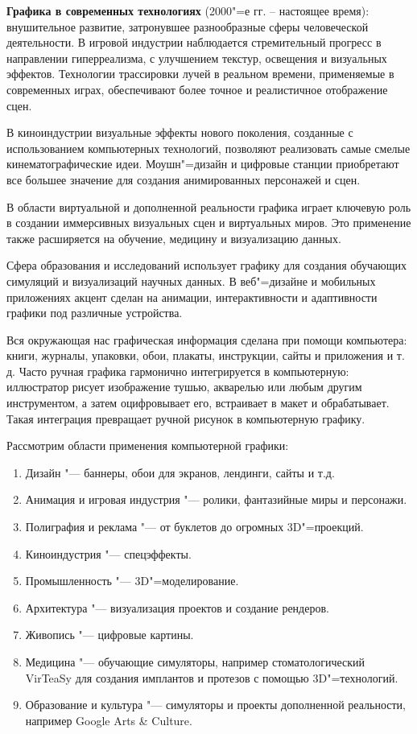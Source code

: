\textbf{Графика в современных технологиях} (2000"=е гг. -- настоящее время): внушительное развитие, затронувшее разнообразные сферы человеческой деятельности. В игровой индустрии наблюдается стремительный прогресс в направлении гиперреализма, с улучшением текстур, освещения и визуальных эффектов. Технологии трассировки лучей в реальном времени, применяемые в современных играх, обеспечивают более точное и реалистичное отображение сцен.

В киноиндустрии визуальные эффекты нового поколения, созданные с использованием компьютерных технологий, позволяют реализовать самые смелые кинематографические идеи. Моушн"=дизайн и цифровые станции приобретают все большее значение для создания анимированных персонажей и сцен.

В области виртуальной и дополненной реальности графика играет ключевую роль в создании иммерсивных визуальных сцен и виртуальных миров. Это применение также расширяется на обучение, медицину и визуализацию данных.

Сфера образования и исследований использует графику для создания обучающих симуляций и визуализаций научных данных. В веб"=дизайне и мобильных приложениях акцент сделан на анимации, интерактивности и адаптивности графики под различные устройства.

Вся окружающая нас графическая информация сделана при помощи компьютера: книги, журналы, упаковки, обои, плакаты, инструкции, сайты и приложения и т. д. Часто ручная графика гармонично интегрируется в компьютерную: иллюстратор рисует изображение тушью, акварелью или любым другим инструментом, а затем оцифровывает его, встраивает в макет и обрабатывает. Такая интеграция превращает ручной рисунок в компьютерную графику.

Рассмотрим области применения компьютерной графики:
\begin{enumerate}
    \item Дизайн "--- баннеры, обои для экранов, лендинги, сайты и т.д.
    \item Анимация и игровая индустрия "--- ролики, фантазийные миры и персонажи.
    \item Полиграфия и реклама "--- от буклетов до огромных 3D"=проекций. 
    \item Киноиндустрия "--- спецэффекты.
    \item Промышленность "--- 3D"=моделирование.  
    \item Архитектура "--- визуализация проектов и создание рендеров.
    \item Живопись "--- цифровые картины.
    \item Медицина "--- обучающие симуляторы, например стоматологический \\ VirTeaSy для создания имплантов и протезов с помощью 3D"=технологий.   
    \item Образование и культура "--- симуляторы и проекты дополненной реальности, например Google Arts \& Culture.
\end{enumerate}